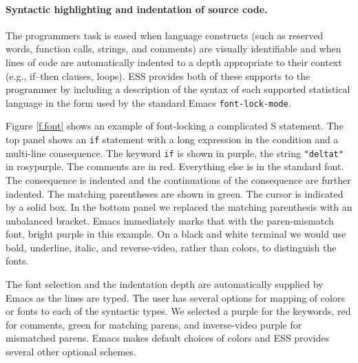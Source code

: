\documentclass{article}
\newcommand{\stexttt}[1]{{\small\texttt{#1}}}
\begin{document}
\paragraph{Syntactic highlighting and indentation of source code.}
The programmers task is eased when language constructs (such as
reserved words, function calls, strings, and comments) are visually
identifiable and when lines of code are automatically indented to a
depth appropriate to their context (e.g., if--then clauses, loops).
ESS provides both of these supports to the programmer by
including a description of the syntax of each
supported statistical language in the form used by the standard Emacs
\stexttt{font-lock-mode}.  

Figure \ref{f.font} shows an example of font-locking a
complicated S statement.  The top panel shows an \stexttt{if}
statement with a long expression in the condition and a multi-line
consequence.  The keyword \stexttt{if} is shown in purple,
the string \stexttt{"deltat"} in rosypurple.  The
comments are in red.  Everything else is in the standard
font.  The consequence is indented and the continuations of the
consequence are further indented.  The matching parentheses are shown
in green.  The cursor is indicated
by a solid box.  In the bottom panel we replaced the matching
parenthesis with an unbalanced bracket.  Emacs immediately marks that
with the paren-mismatch font, bright purple in this example.
On a black and white terminal we would use bold, underline, italic,
and reverse-video, rather than colors, to distinguish the fonts.


The font selection and the indentation depth are automatically
supplied by Emacs as the lines are typed.  The user has several
options for mapping of colors or fonts to each of the syntactic types.
We selected a 
purple for the keywords, red for comments, green
for matching parens, and inverse-video purple for mismatched parens.
Emacs makes default choices of colors and ESS
provides several other optional schemes.
\end{document}
